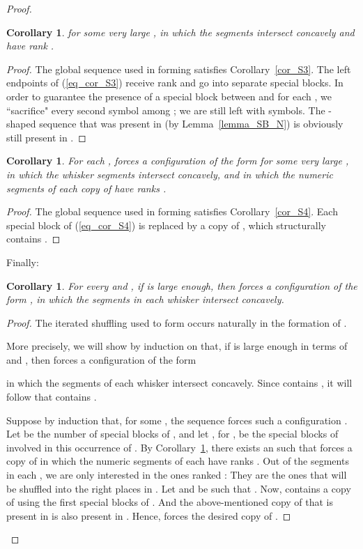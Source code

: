 \documentclass[11pt]{article}
\newtheorem{corollary}[theorem]{Corollary}
\theoremstyle{definition}
\theoremstyle{remark}
\begin{document}
\begin{proof}
\begin{corollary}
for some very large , in which the segments  intersect concavely and have rank .
\end{corollary}

\begin{proof}
The global sequence  used in forming  satisfies Corollary~\ref{cor_S3}. The left endpoints  of (\ref{eq_cor_S3}) receive rank  and go into separate special blocks. In order to guarantee the presence of a special block between  and  for each , we ``sacrifice" every second symbol among ; we are still left with  symbols. The -shaped sequence  that was present in  (by Lemma~\ref{lemma_SB_N}) is obviously still present in .
\end{proof}

\begin{corollary}\label{cor_S5}
For each ,  forces a configuration of the form  for some very large , in which the whisker segments  intersect concavely, and in which the numeric segments of each copy of  have ranks .
\end{corollary}

\begin{proof}
The global sequence  used in forming  satisfies Corollary~\ref{cor_S4}. Each special block of (\ref{eq_cor_S4}) is replaced by a copy of , which structurally contains .
\end{proof}

Finally:

\begin{corollary}\label{cor_S6}
For every  and , if  is large enough, then  forces a configuration of the form , in which the segments  in each whisker intersect concavely.
\end{corollary}

\begin{proof}
The iterated shuffling used to form  occurs naturally in the formation of .

More precisely, we will show by induction on  that, if  is large enough in terms of  and , then  forces a configuration of the form

in which the segments of each whisker intersect concavely. Since  contains , it will follow that  contains .

Suppose by induction that, for some , the sequence  forces such a configuration . Let  be the number of special blocks of , and let , for , be the special blocks of  involved in this occurrence of . By Corollary~\ref{cor_S5}, there exists an  such that  forces a copy of  in which the numeric segments of each  have ranks . Out of the  segments in each , we are only interested in the ones ranked : They are the ones that will be shuffled into the right places in . Let  and  be such that . Now,  contains a copy of  using the first  special blocks of . And the above-mentioned copy of  that is present in  is also present in . Hence,  forces the desired copy of .
\end{proof}


\end{proof}
\end{document}
